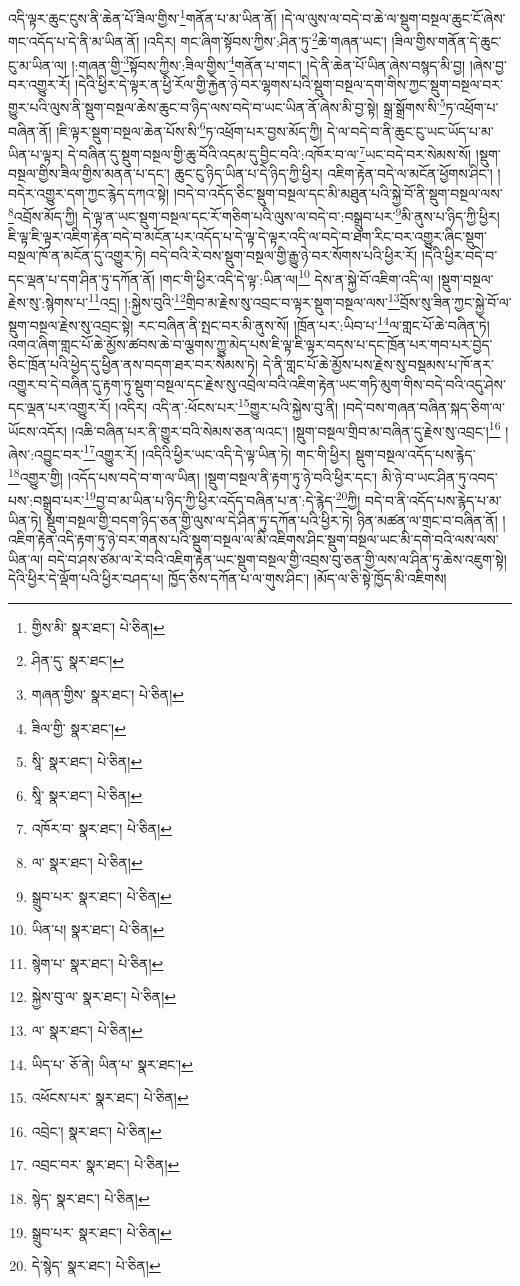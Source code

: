 འདི་ལྟར་ཆུང་ངུས་ནི་ཆེན་པོ་ཟིལ་གྱིས་\footnote{གྱིས་མི་  སྣར་ཐང་།  པེ་ཅིན། }གནོན་པ་མ་ཡིན་ནོ། །དེ་ལ་ལུས་ལ་བདེ་བ་ཆེ་ལ་སྡུག་བསྔལ་ཆུང་ངོ་ཞེས་གང་འདོད་པ་དེ་ནི་མ་ཡིན་ནོ། །འདིར། གང་ཞིག་སྟོབས་ཀྱིས་:ཤིན་ཏུ་\footnote{ཤིན་དུ་  སྣར་ཐང་། }ཆེ་གཞན་ཡང་། །ཟིལ་གྱིས་གནོན་དེ་ཆུང་ངུ་མ་ཡིན་ལ། །:གཞན་གྱི་\footnote{གཞན་གྱིས་  སྣར་ཐང་།  པེ་ཅིན། }སྟོབས་ཀྱིས་:ཟིལ་གྱིས་\footnote{ཟིལ་གྱི་  སྣར་ཐང་། }གནོན་པ་གང་། །དེ་ནི་ཆེན་པོ་ཡིན་ཞེས་བསྙད་མི་བྱ། །ཞེས་བྱ་བར་འགྱུར་རོ། །དེའི་ཕྱིར་དེ་ལྟར་ན་ཕྱི་རོལ་གྱི་རྐྱེན་ཉེ་བར་ལྷགས་པའི་སྡུག་བསྔལ་དག་གིས་ཀྱང་སྡུག་བསྔལ་བར་གྱུར་པའི་ལུས་ནི་སྡུག་བསྔལ་ཆེས་ཆུང་བ་ཉིད་ལས་བདེ་བ་ཡང་ཡིན་ནོ་ཞེས་མི་བྱ་སྟེ། སྒྲ་སྒྲོགས་སི་\footnote{སཱི་  སྣར་ཐང་།  པེ་ཅིན། }ཏ་འཕྲོག་པ་བཞིན་ནོ། །ཇི་ལྟར་སྡུག་བསྔལ་ཆེན་པོས་སི་\footnote{སཱི་  སྣར་ཐང་།  པེ་ཅིན། }ཏ་འཕྲོག་པར་བྱས་མོད་ཀྱི། དེ་ལ་བདེ་བ་ནི་ཆུང་ངུ་ཡང་ཡོད་པ་མ་ཡིན་པ་ལྟར། དེ་བཞིན་དུ་སྡུག་བསྔལ་གྱི་ཆུ་བོའི་འདམ་དུ་བྱིང་བའི་:འཁོར་བ་ལ་\footnote{འཁོར་བ་  སྣར་ཐང་།  པེ་ཅིན། }ཡང་བདེ་བར་སེམས་སོ། །སྡུག་བསྔལ་གྱིས་ཟིལ་གྱིས་མནན་པ་དང་། ཆུང་ངུ་ཉིད་ཡིན་པ་དེ་ཉིད་ཀྱི་ཕྱིར། འཇིག་རྟེན་བདེ་ལ་མངོན་ཕྱོགས་ཤིང་། །བདེར་འགྱུར་དག་ཀྱང་རྙེད་དཀའ་སྟེ། །བདེ་བ་འདོད་ཅིང་སྡུག་བསྔལ་དང་མི་མཐུན་པའི་སྐྱེ་བོ་ནི་སྡུག་བསྔལ་ལས་\footnote{ལ་  སྣར་ཐང་།  པེ་ཅིན། }འབྲོས་མོད་ཀྱི། དེ་ལྟ་ན་ཡང་སྡུག་བསྔལ་དང་རོ་གཅིག་པའི་ལུས་ལ་བདེ་བ་:བསྒྲུབ་པར་\footnote{སྒྲུབ་པར་  སྣར་ཐང་།  པེ་ཅིན། }མི་ནུས་པ་ཉིད་ཀྱི་ཕྱིར། ཇི་ལྟ་ཇི་ལྟར་འཇིག་རྟེན་བདེ་བ་མངོན་པར་འདོད་པ་དེ་ལྟ་དེ་ལྟར་འདི་ལ་བདེ་བ་ཐག་རིང་བར་འགྱུར་ཞིང་སྡུག་བསྔལ་ཁོ་ན་མངོན་དུ་འགྱུར་ཏེ། བདེ་བའི་རེ་བས་སྡུག་བསྔལ་གྱི་རྒྱུ་ཉེ་བར་སོགས་པའི་ཕྱིར་རོ། །དེའི་ཕྱིར་བདེ་བ་དང་ལྡན་པ་དག་ཤིན་ཏུ་དཀོན་ནོ། །གང་གི་ཕྱིར་འདི་དེ་ལྟ་:ཡིན་ལ།\footnote{ཡིན་པ།  སྣར་ཐང་།  པེ་ཅིན། } དེས་ན་སྐྱེ་བོ་འཇིག་འདི་ལ། །སྡུག་བསྔལ་རྗེས་སུ་:སྙེགས་པ་\footnote{སྙེག་པ་  སྣར་ཐང་།  པེ་ཅིན། }འདྲ། །:སྐྱེས་བུའི་\footnote{སྐྱེས་བུ་ལ་  སྣར་ཐང་།  པེ་ཅིན། }གྲིབ་མ་རྗེས་སུ་འབྲང་བ་ལྟར་སྡུག་བསྔལ་ལས་\footnote{ལ་  སྣར་ཐང་།  པེ་ཅིན། }བྲོས་སུ་ཟིན་ཀྱང་སྐྱེ་བོ་ལ་སྡུག་བསྔལ་རྗེས་སུ་འབྲང་སྟེ། རང་བཞིན་ནི་སྤང་བར་མི་ནུས་སོ། །ཁྲོན་པར་:ཡིབ་པ་\footnote{ཡིད་པ་  ཅོ་ནེ། ཡིན་པ་  སྣར་ཐང་། }ལ་གླང་པོ་ཆེ་བཞིན་ཏེ། འགའ་ཞིག་གླང་པོ་ཆེ་མྱོས་ཚབས་ཆེ་བ་ལྕགས་ཀྱུ་མེད་པས་ཇི་ལྟ་ཇི་ལྟར་བདས་པ་དང་ཁྲོན་པར་གབ་པར་བྱེད་ཅིང་ཁྲོན་པའི་ཕྱེད་དུ་ཕྱིན་ནས་བདག་ཐར་བར་སེམས་ཏེ། དེ་ནི་གླང་པོ་ཆེ་མྱོས་པས་རྗེས་སུ་བསྡམས་པ་ཁོ་ནར་འགྱུར་བ་དེ་བཞིན་དུ་རྟག་ཏུ་སྡུག་བསྔལ་དང་རྗེས་སུ་འབྲེལ་བའི་འཇིག་རྟེན་ཡང་གཏི་མུག་གིས་བདེ་བའི་འདུ་ཤེས་དང་ལྡན་པར་འགྱུར་རོ། །འདིར། འདི་ན་:ཕོངས་པར་\footnote{འཕོངས་པར་  སྣར་ཐང་།  པེ་ཅིན། }གྱུར་པའི་སྐྱེས་བུ་ནི། །བདེ་བས་གཞན་བཞིན་སྐད་ཅིག་ལ་ཡོངས་འདོར། །འཆི་བཞིན་པར་ནི་གྱུར་བའི་སེམས་ཅན་ལའང་། །སྡུག་བསྔལ་གྲིབ་མ་བཞིན་དུ་རྗེས་སུ་འབྲང་།\footnote{འབྲེང་།  སྣར་ཐང་།  པེ་ཅིན། } །ཞེས་:འབྱུང་བར་\footnote{འབྲང་བར་  སྣར་ཐང་།  པེ་ཅིན། }འགྱུར་རོ། །འདིའི་ཕྱིར་ཡང་འདི་དེ་ལྟ་ཡིན་ཏེ། གང་གི་ཕྱིར། སྡུག་བསྔལ་འདོད་པས་རྙེད་\footnote{སྙེད་  སྣར་ཐང་།  པེ་ཅིན། }འགྱུར་གྱི། །འདོད་པས་བདེ་བ་ག་ལ་ཡིན། །སྡུག་བསྔལ་ནི་རྟག་ཏུ་ཉེ་བའི་ཕྱིར་དང་། མི་ཉེ་བ་ཡང་ཤིན་ཏུ་འབད་པས་:བསྒྲུབ་པར་\footnote{སྒྲུབ་པར་  སྣར་ཐང་།  པེ་ཅིན། }བྱ་བ་མ་ཡིན་པ་ཉིད་ཀྱི་ཕྱིར་འདོད་བཞིན་པ་ན་:དེ་རྙེད་\footnote{དེ་སྙེད་  སྣར་ཐང་།  པེ་ཅིན། }ཀྱི། བདེ་བ་ནི་འདོད་པས་རྙེད་པ་མ་ཡིན་ཏེ། སྡུག་བསྔལ་གྱི་བདག་ཉིད་ཅན་གྱི་ལུས་ལ་དེ་ཤིན་ཏུ་དཀོན་པའི་ཕྱིར་ཏེ། ཉིན་མཚན་ལ་གྲང་བ་བཞིན་ནོ། །འཇིག་རྟེན་འདི་རྟག་ཏུ་ཉེ་བར་གནས་པའི་སྡུག་བསྔལ་ལ་མི་འཇིགས་ཤིང་སྡུག་བསྔལ་ཡང་མི་དགེ་བའི་ལས་ལས་ཡིན་ལ། བདེ་བ་ཤས་ཙམ་ལ་རེ་བའི་འཇིག་རྟེན་ཡང་སྡུག་བསྔལ་གྱི་འབྲས་བུ་ཅན་གྱི་ལས་ལ་ཤིན་ཏུ་ཆེས་འཇུག་སྟེ། དེའི་ཕྱིར་དེ་ལྡོག་པའི་ཕྱིར་བཤད་པ། ཁྱོད་ཅིས་དཀོན་པ་ལ་གུས་ཤིང་། །མོད་ལ་ཅི་སྟེ་ཁྱོད་མི་འཇིགས། 